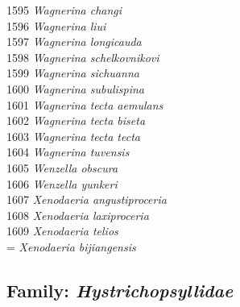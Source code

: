 \documentclass[
]{article}
\begin{document}
1595 \emph{Wagnerina changi}\\
1596 \emph{Wagnerina liui}\\
1597 \emph{Wagnerina longicauda}\\
1598 \emph{Wagnerina schelkovnikovi}\\
1599 \emph{Wagnerina sichuanna}\\
1600 \emph{Wagnerina subulispina}\\
1601 \emph{Wagnerina tecta aemulans}\\
1602 \emph{Wagnerina tecta biseta}\\
1603 \emph{Wagnerina tecta tecta}\\
1604 \emph{Wagnerina tuvensis}\\
1605 \emph{Wenzella obscura}\\
1606 \emph{Wenzella yunkeri}\\
1607 \emph{Xenodaeria angustiproceria}\\
1608 \emph{Xenodaeria laxiproceria}\\
1609 \emph{Xenodaeria telios}\\
= \emph{Xenodaeria bijiangensis}

\hypertarget{family-hystrichopsyllidae}{%
\subsection{\texorpdfstring{Family:
\emph{Hystrichopsyllidae}}{Family: Hystrichopsyllidae}}\label{family-hystrichopsyllidae}}
\end{document}
